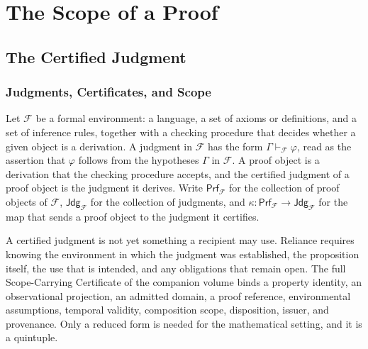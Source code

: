 \documentclass[11pt]{book}
\theoremstyle{definition}
\theoremstyle{remark}
\newcommand{\Prf}{\mathsf{Prf}}
\newcommand{\Jdg}{\mathsf{Jdg}}
\newcommand{\cert}{\kappa}
\newcommand{\Fenv}{\mathcal{F}}
\begin{document}
\part{The Scope of a Proof}

\chapter{The Certified Judgment}

\section{Judgments, Certificates, and Scope}

Let $\Fenv$ be a formal environment: a language, a set of axioms or definitions, and a set of inference rules, together with a checking procedure that decides whether a given object is a derivation. A judgment in $\Fenv$ has the form $\Gamma \vdash_{\Fenv} \varphi$, read as the assertion that $\varphi$ follows from the hypotheses $\Gamma$ in $\Fenv$. A proof object is a derivation that the checking procedure accepts, and the certified judgment of a proof object is the judgment it derives. Write $\Prf_{\Fenv}$ for the collection of proof objects of $\Fenv$, $\Jdg_{\Fenv}$ for the collection of judgments, and $\cert\colon \Prf_{\Fenv}\to \Jdg_{\Fenv}$ for the map that sends a proof object to the judgment it certifies.

A certified judgment is not yet something a recipient may use. Reliance requires knowing the environment in which the judgment was established, the proposition itself, the use that is intended, and any obligations that remain open. The full Scope-Carrying Certificate of the companion volume binds a property identity, an observational projection, an admitted domain, a proof reference, environmental assumptions, temporal validity, composition scope, disposition, issuer, and provenance. Only a reduced form is needed for the mathematical setting, and it is a quintuple.
\end{document}

